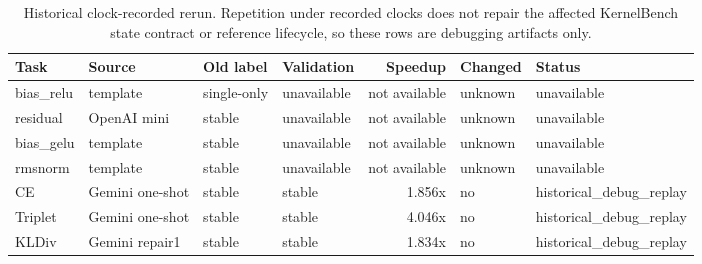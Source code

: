 \begin{table}[htbp]
\centering
\caption{Historical clock-recorded rerun. Repetition under recorded clocks does not repair the affected KernelBench state contract or reference lifecycle, so these rows are debugging artifacts only.}
\label{tab:headline-clock-validation}
\scriptsize
\begin{tabularx}{\linewidth}{l l l l r l l}
\toprule
Task & Source & Old label & Validation & Speedup & Changed & Status \\
\midrule
bias\_relu & template & single-only & unavailable & not available & unknown & unavailable \\
residual & OpenAI mini & stable & unavailable & not available & unknown & unavailable \\
bias\_gelu & template & stable & unavailable & not available & unknown & unavailable \\
rmsnorm & template & stable & unavailable & not available & unknown & unavailable \\
CE & Gemini one-shot & stable & stable & 1.856x & no & historical\_debug\_replay \\
Triplet & Gemini one-shot & stable & stable & 4.046x & no & historical\_debug\_replay \\
KLDiv & Gemini repair1 & stable & stable & 1.834x & no & historical\_debug\_replay \\
\bottomrule
\end{tabularx}
\end{table}
